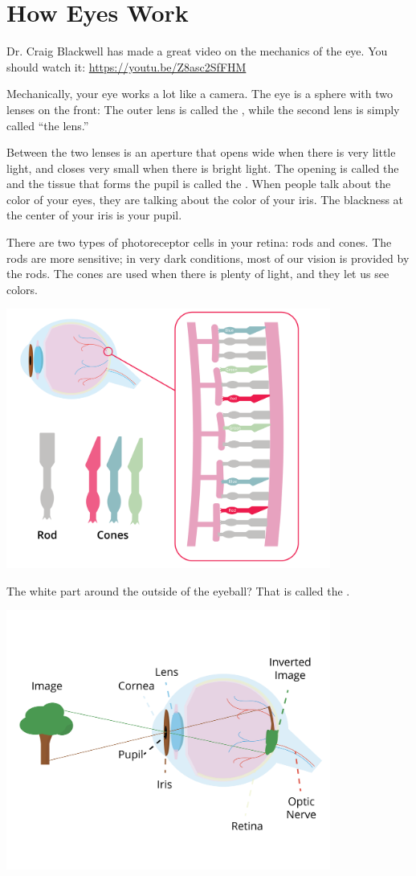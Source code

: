 \chapter{How Eyes Work}

Dr. Craig Blackwell has made a great video on the mechanics of the
eye. You should watch it: \url{https://youtu.be/Z8asc2SfFHM}

Mechanically, your eye works a lot like a camera.  The eye is a sphere
with two lenses on the front: The outer lens is called the , while the
second lens is simply called ``the lens.''

Between the two lenses is an aperture that opens wide when there is
very little light, and closes very small when there is bright light.
The opening is called the  and the tissue that forms
the pupil is called the . When people talk about the color
of your eyes, they are talking about the color of your iris. The
blackness at the center of your iris is your pupil.

There are two types of photoreceptor cells in your retina: rods and
cones. The rods are more sensitive; in very dark conditions, most of
our vision is provided by the rods. The cones are used when there is
plenty of light, and they let us see colors.

\includegraphics[width=0.8\textwidth]{conerod.png}


The white part around the outside of the eyeball? That is called the
.

\includegraphics[width=0.8\textwidth]{eyeDiagram.png}


